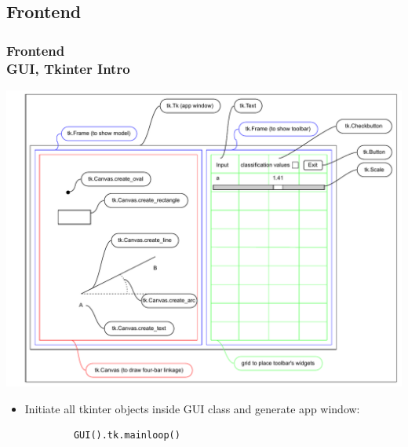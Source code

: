\documentclass[ucs,10pt]{beamer}
\begin{document}
\subsection{Frontend}

\begin{frame}[fragile]
\frametitle{Frontend \\
	\small \color{rwth-blue} GUI, Tkinter Intro}
	\begin{center}
		\vspace*{-1mm}
		\includegraphics[width=0.78\linewidth]{./Figures/Implementation/GUI/tkinter_grid.pdf}
		\begin{itemize}
			\item Initiate all tkinter objects inside GUI class and generate app window:
		\end{itemize}
		\begin{lstlisting}
			GUI().tk.mainloop()
		\end{lstlisting}
	\end{center}
\end{frame}
\end{document}
